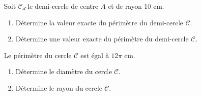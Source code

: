 \begin{pageAD}

Soit $\mathcal{C_d}$ le demi-cercle de centre $A$ et de rayon $10$ cm.
\begin{enumerate}
\item Détermine la valeur exacte du périmètre du demi-cercle $\mathcal{C}$. 
\item Détermine une valeur exacte du périmètre du demi-cercle $\mathcal{C}$. 
 \end{enumerate}  

 

Le périmètre du cercle $\mathcal{C}$ est égal à $12\pi$ cm.
 \begin{enumerate}
\item Détermine le diamètre du cercle $\mathcal{C}$. 
\item Détermine le rayon du cercle $\mathcal{C}$.
 \end{enumerate}  

 
\end{pageAD}
  
